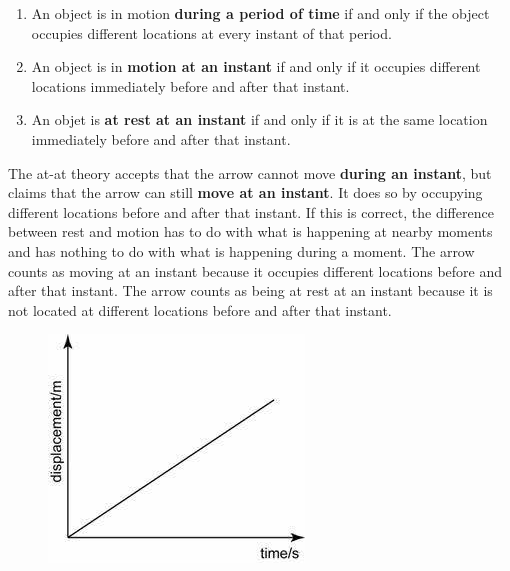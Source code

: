 \documentclass[oneside]{article}
\begin{document}
\begin{enumerate}
\item An object is in motion \textbf{during a period of time} if and only if the object occupies different locations at every instant of that period.
\item An object is in \textbf{motion at an instant} if and only if it occupies different locations immediately before and after that instant. 
\item An objet is \textbf{at rest at an instant} if and only if it is at the same location immediately before and after that instant. 
\end{enumerate}
The at-at theory accepts that the arrow cannot move \textbf{during an instant}, but claims that the arrow can still \textbf{move at an instant}. It does so by occupying different locations before and after that instant. If this is correct, the difference between rest and motion has to do with what is happening at nearby moments and has nothing to do with what is happening during a moment. The arrow counts as moving at an instant because it occupies different locations before and after that instant. The arrow counts as being at rest at an instant because it is not located at different locations before and after that instant.
\newpage

\begin{figure}[h]
  \includegraphics[width=\linewidth]{graph.jpg}
\end{figure}
\end{document}
